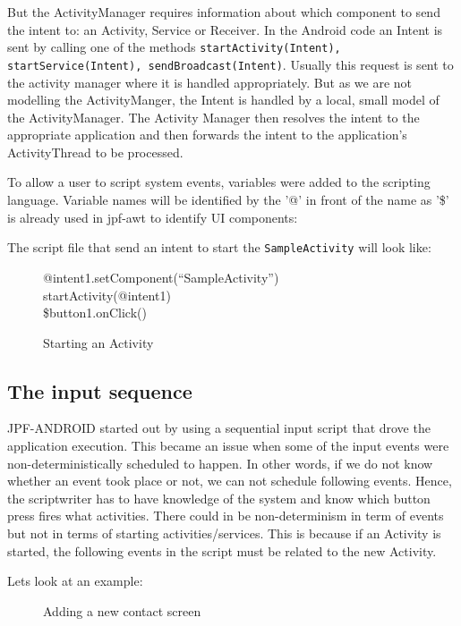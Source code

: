 \documentclass{acm_proc_article-sp}
\begin{document}
But the ActivityManager requires information about which component to send the intent to: an Activity, Service or Receiver. In the Android
code
an Intent is sent by calling one of the methods \texttt{startActivity(Intent), startService(Intent), sendBroadcast(Intent)}. Usually this
request is sent to the activity manager where it is handled appropriately. But as we are not modelling the
ActivityManger, the Intent is handled by a local, small model of the ActivityManager. The Activity Manager then resolves the intent to the
appropriate application and then forwards the intent to the application's ActivityThread to be processed.

To allow a user to script system events, variables were added to the scripting language. Variable names will be identified by
the '@' in front of the name as '\$' is already used in jpf-awt to identify UI components:

The script file that send an intent to start the \texttt{SampleActivity} will look like:
\begin{figure}
{\small
{\sf 
@intent1.setComponent(``SampleActivity'')\\
startActivity(@intent1)\\
\$button1.onClick()
}
}
\caption{Starting an Activity}
\end{figure}










\subsection{The input sequence}
JPF-ANDROID started out by using a sequential input script that drove the application execution. This became an issue when some of the
input events were non-deterministically scheduled to happen. In other words, if we do not know whether an event took place or
not, we can not schedule following events. Hence, the scriptwriter has to have knowledge of the system and
know which button press fires what activities. There could in be non-determinism in term of events but not in terms of starting
activities/services. This is because if an Activity is started, the following events in the script must be related to the new Activity. 

Lets look at an example:
\begin{figure}
\centering
{}
\caption{Adding a new contact screen}
\end{figure}
\end{document}
